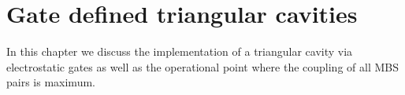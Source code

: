 \chapter{Gate defined triangular cavities}
In this chapter we discuss the implementation of a triangular cavity via electrostatic gates as well as the operational point where the coupling of all MBS pairs is maximum.